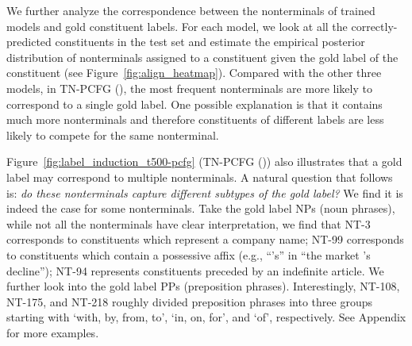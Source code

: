 \documentclass[11pt]{article}
\begin{document}
We further analyze the correspondence between the nonterminals of trained models and gold constituent labels.
For each model, we look at all the correctly-predicted constituents in the test set and estimate the empirical posterior distribution of nonterminals assigned to a constituent given the gold label of the constituent (see Figure~\ref{fig:align_heatmap}).
Compared with the other three models,
in TN-PCFG (), the most frequent nonterminals are more likely to correspond to a single gold label.
One possible explanation is that it contains much more nonterminals and therefore constituents of different labels are less likely to compete for the same nonterminal.

Figure~\ref{fig:label_induction_t500-pcfg} (TN-PCFG ()) also illustrates that a gold label may correspond to multiple nonterminals. 
A natural question that follows is: \textit{do these nonterminals capture different subtypes of the gold label?}
We find it is indeed the case for some nonterminals.
Take the gold label NPs (noun phrases),
while not all the nonterminals have clear interpretation, 
we find that NT-3 corresponds to constituents which represent a company name;
NT-99 corresponds to constituents which contain a possessive affix (e.g., ``'s'' in ``the market 's decline'');
NT-94 represents constituents preceded by an indefinite article.
We further look into the gold label PPs (preposition phrases).
Interestingly, NT-108, NT-175, and NT-218 roughly divided preposition phrases into three groups starting with `with, by, from, to', `in, on, for', and `of', respectively. See Appendix for more examples.
\end{document}
